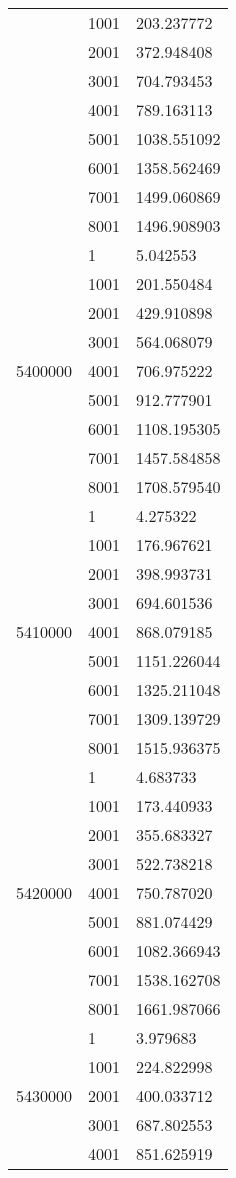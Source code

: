 \begin{table}[htb!]
\begin{tabular}{lll}
 & 1001 & 203.237772 \\
 & 2001 & 372.948408 \\
 & 3001 & 704.793453 \\
 & 4001 & 789.163113 \\
 & 5001 & 1038.551092 \\
 & 6001 & 1358.562469 \\
 & 7001 & 1499.060869 \\
 & 8001 & 1496.908903 \\
\multirow[c]{9}{*}{5400000} & 1 & 5.042553 \\
 & 1001 & 201.550484 \\
 & 2001 & 429.910898 \\
 & 3001 & 564.068079 \\
 & 4001 & 706.975222 \\
 & 5001 & 912.777901 \\
 & 6001 & 1108.195305 \\
 & 7001 & 1457.584858 \\
 & 8001 & 1708.579540 \\
\multirow[c]{9}{*}{5410000} & 1 & 4.275322 \\
 & 1001 & 176.967621 \\
 & 2001 & 398.993731 \\
 & 3001 & 694.601536 \\
 & 4001 & 868.079185 \\
 & 5001 & 1151.226044 \\
 & 6001 & 1325.211048 \\
 & 7001 & 1309.139729 \\
 & 8001 & 1515.936375 \\
\multirow[c]{9}{*}{5420000} & 1 & 4.683733 \\
 & 1001 & 173.440933 \\
 & 2001 & 355.683327 \\
 & 3001 & 522.738218 \\
 & 4001 & 750.787020 \\
 & 5001 & 881.074429 \\
 & 6001 & 1082.366943 \\
 & 7001 & 1538.162708 \\
 & 8001 & 1661.987066 \\
\multirow[c]{9}{*}{5430000} & 1 & 3.979683 \\
 & 1001 & 224.822998 \\
 & 2001 & 400.033712 \\
 & 3001 & 687.802553 \\
 & 4001 & 851.625919 \\

\end{tabular}
\end{table}
